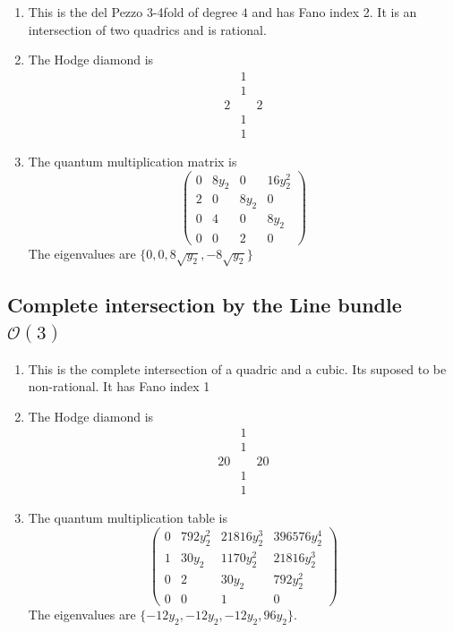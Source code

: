 \documentclass[11pt]{amsart}
\newcounter{num}[section] %
\begin{document}
\begin{enumerate}
    \item [1)] This is the del Pezzo $3$-4fold of degree $4$ and has Fano index 2. It is an intersection of two quadrics and is rational.

    \item[2)] The Hodge diamond is
    \[
    \begin{array}{ccc}
         &1&  \\
         &1&\\
         2&&2\\
         &1&\\
         &1&
    \end{array}
    \]
    \item[3)] The quantum multiplication matrix is
    \[
    \begin{pmatrix}
        0 & 8y_2 & 0 & 16y_2^2 \\
        2 & 0 & 8y_2 & 0 \\
        0 & 4 & 0 & 8y_2 \\
        0 & 0 & 2 & 0
    \end{pmatrix}
    \]
The eigenvalues are $\{0,0,8\sqrt{y_2},-8\sqrt{y_2}\}$
\end{enumerate}

\subsection{Complete intersection by the Line bundle $\mathcal{O}(3)$}
\begin{enumerate}
   

\item[1)] This is the complete intersection of a quadric and a cubic. Its suposed to be non-rational. It has Fano index 1
\item[2)] The Hodge diamond is 
\[
    \begin{array}{ccc}
         &1&  \\
         &1&\\
         20&&20\\
         &1&\\
         &1&
    \end{array}
\]
\item[3)] The quantum multiplication table is
\[
\begin{pmatrix}
0 & 792y_2^{2} & 21816y_2^{3} & 396576y_2^{4} \\
1 & 30y_2 & 1170y_2^{2} & 21816y_2^{3} \\
0 & 2 & 30y_2 & 792y_2^{2} \\
0 & 0 & 1 & 0
\end{pmatrix}
\]
The eigenvalues are $\{-12y_2 , -12y_2 , -12y_2, 96y_2\}$.
\end{enumerate}
\end{document}

